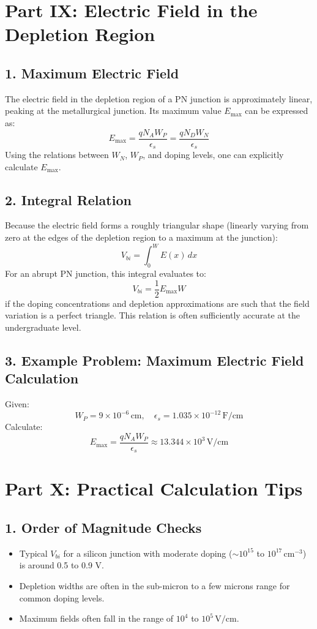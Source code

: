 \documentclass[12pt]{article}
\begin{document}
\section{Part IX: Electric Field in the Depletion Region}

\subsection{1. Maximum Electric Field}
The electric field in the depletion region of a PN junction is approximately linear, peaking at the metallurgical junction. Its maximum value \( E_{\max} \) can be expressed as:
\[
E_{\max} = \frac{q N_A W_P}{\epsilon_s} = \frac{q N_D W_N}{\epsilon_s}
\]
Using the relations between \( W_N \), \( W_P \), and doping levels, one can explicitly calculate \( E_{\max} \).

\subsection{2. Integral Relation}
Because the electric field forms a roughly triangular shape (linearly varying from zero at the edges of the depletion region to a maximum at the junction):
\[
V_{bi} = \int_0^W E(x) \, dx
\]
For an abrupt PN junction, this integral evaluates to:
\[
V_{bi} = \frac{1}{2}E_{\max}W
\]
if the doping concentrations and depletion approximations are such that the field variation is a perfect triangle. This relation is often sufficiently accurate at the undergraduate level.

\subsection{3. Example Problem: Maximum Electric Field Calculation}
Given:
\[
W_P = 9 \times 10^{-6}\, \text{cm}, \quad \epsilon_s = 1.035 \times 10^{-12}\, \text{F/cm}
\]
Calculate:
\[
E_{\max} = \frac{q N_A W_P}{\epsilon_s} \approx 13.344 \times 10^{3}\, \text{V/cm}
\]

\section{Part X: Practical Calculation Tips}

\subsection{1. Order of Magnitude Checks}
\begin{itemize}
    \item Typical \( V_{bi} \) for a silicon junction with moderate doping (\( \sim 10^{15} \) to \( 10^{17}\, \text{cm}^{-3} \)) is around 0.5 to 0.9 V.
    \item Depletion widths are often in the sub-micron to a few microns range for common doping levels.
    \item Maximum fields often fall in the range of \( 10^{4} \) to \( 10^{5}\, \text{V/cm} \).
\end{itemize}
\end{document}
